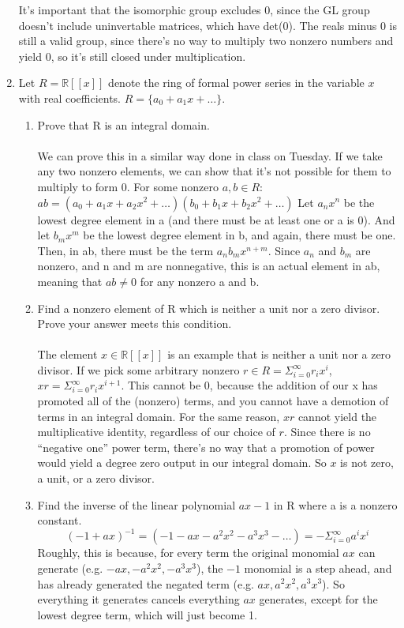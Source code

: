 \begin{enumerate}
  It's important that the isomorphic group excludes 0, since the GL group doesn't include uninvertable matrices, which have det(0). The reals minus 0 is still a valid group, since there's no way to multiply two nonzero numbers and yield 0, so it's still closed under multiplication.

\item Let $R = \mathds{R}[[x]]$ denote the ring of formal power series in the variable $x$ with real coefficients. $R = \{a_0 + a_1x + \ldots\}$. 
  \begin{enumerate}
    \item Prove that R is an integral domain.\\\\

      We can prove this in a similar way done in class on Tuesday. If we take any two nonzero elements, we can show that it's not possible for them to multiply to form 0. For some nonzero $a,b \in R$:
      $ab = (a_0+a_1x+a_2x^2+\ldots)(b_0+b_1x+b_2x^2+\ldots)$
      Let $a_nx^n$ be the lowest degree element in a (and there must be at least one or a is 0). And let $b_mx^m$ be the lowest degree element in b, and again, there must be one. Then, in ab, there must be the term $a_nb_mx^{n+m}$. Since $a_n$ and $b_m$ are nonzero, and n and m are nonnegative, this is an actual element in ab, meaning that $ab \neq 0$ for any nonzero a and b.

    \item Find a nonzero element of R which is neither a unit nor a zero divisor. Prove your answer meets this condition.\\\\
      The element $x \in \mathds{R}[[x]]$ is an example that is neither a unit nor a zero divisor. If we pick some arbitrary nonzero $r \in R = \Sigma_{i=0}^\infty r_ix^i$, $xr = \Sigma_{i=0}^\infty r_ix^{i+1}$. This cannot be 0, because the addition of our x has promoted all of the (nonzero) terms, and you cannot have a demotion of terms in an integral domain. For the same reason, $xr$ cannot yield the multiplicative identity, regardless of our choice of $r$. Since there is no ``negative one'' power term, there's no way that a promotion of power would yield a degree zero output in our integral domain. So $x$ is not zero, a unit, or a zero divisor.
    \item Find the inverse of the linear polynomial $ax - 1$ in R where a is a nonzero constant.
      $$(-1 + ax)^{-1} = (-1 - ax - a^2x^2 - a^3x^3 - \ldots) = -\Sigma_{i=0}^\infty a^ix^i$$
      Roughly, this is because, for every term the original monomial $ax$ can generate (e.g. $-ax, -a^2x^2, -a^3x^3$), the $-1$ monomial is a step ahead, and has already generated the negated term (e.g. $ax, a^2x^2, a^3x^3$). So everything it generates cancels everything $ax$ generates, except for the lowest degree term, which will just become 1.
  \end{enumerate}
  

\end{enumerate}
